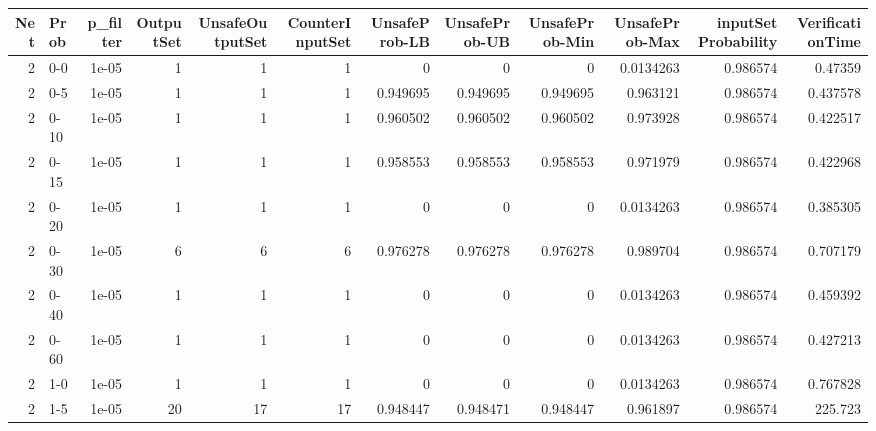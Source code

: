 \begin{tabular}{rlrrrrrrrrrr}
\hline
   Net & Prob   &   p\_filter &   OutputSet &   UnsafeOutputSet &   CounterInputSet &   UnsafeProb-LB &   UnsafeProb-UB &   UnsafeProb-Min &   UnsafeProb-Max &   inputSet Probability &   VerificationTime \\
\hline
     2 & 0-0    &      1e-05 &           1 &                 1 &                 1 &     0           &     0           &      0           &        0.0134263 &               0.986574 &           0.47359  \\
     2 & 0-5    &      1e-05 &           1 &                 1 &                 1 &     0.949695    &     0.949695    &      0.949695    &        0.963121  &               0.986574 &           0.437578 \\
     2 & 0-10   &      1e-05 &           1 &                 1 &                 1 &     0.960502    &     0.960502    &      0.960502    &        0.973928  &               0.986574 &           0.422517 \\
     2 & 0-15   &      1e-05 &           1 &                 1 &                 1 &     0.958553    &     0.958553    &      0.958553    &        0.971979  &               0.986574 &           0.422968 \\
     2 & 0-20   &      1e-05 &           1 &                 1 &                 1 &     0           &     0           &      0           &        0.0134263 &               0.986574 &           0.385305 \\
     2 & 0-30   &      1e-05 &           6 &                 6 &                 6 &     0.976278    &     0.976278    &      0.976278    &        0.989704  &               0.986574 &           0.707179 \\
     2 & 0-40   &      1e-05 &           1 &                 1 &                 1 &     0           &     0           &      0           &        0.0134263 &               0.986574 &           0.459392 \\
     2 & 0-60   &      1e-05 &           1 &                 1 &                 1 &     0           &     0           &      0           &        0.0134263 &               0.986574 &           0.427213 \\
     2 & 1-0    &      1e-05 &           1 &                 1 &                 1 &     0           &     0           &      0           &        0.0134263 &               0.986574 &           0.767828 \\
     2 & 1-5    &      1e-05 &          20 &                17 &                17 &     0.948447    &     0.948471    &      0.948447    &        0.961897  &               0.986574 &         225.723    \\

\end{tabular}

